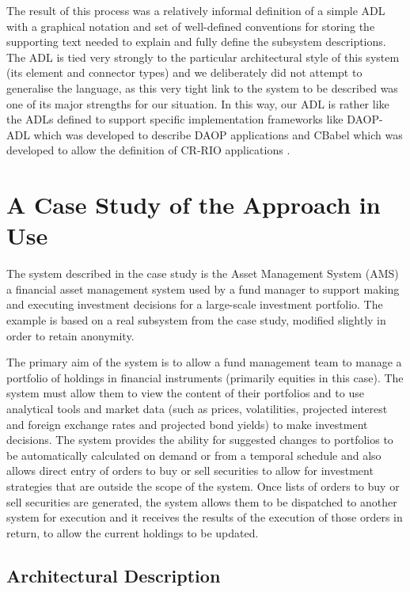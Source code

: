   The result of this process was a relatively informal definition of a simple ADL with a graphical notation and set of well-defined conventions for storing the supporting text needed to explain and fully define the subsystem descriptions.  The ADL is tied very strongly to the particular architectural style of this system (its element and connector types) and we deliberately did not attempt to generalise the language, as this very tight link to the system to be described was one of its major strengths for our situation.  In this way, our ADL is rather like the ADLs defined to support specific implementation frameworks like DAOP-ADL \cite{pinto2003-daopadl} which was developed to describe DAOP applications \cite{pinto2001-daop} and CBabel \cite{rademaker2005-cbabel} which was developed to allow the definition of CR-RIO applications \cite{loques2004-crrio}.

\section{A Case Study of the Approach in Use}

  The system described in the case study is the Asset Management System (AMS) a financial asset management system used by a fund manager to support making and executing investment decisions for a large-scale investment portfolio.  The example is based on a real subsystem from the case study, modified slightly in order to retain anonymity.

  The primary aim of the system is to allow a fund management team to manage a portfolio of holdings in financial instruments (primarily equities in this case).  The system must allow them to view the content of their portfolios and to use analytical tools and market data (such as prices, volatilities, projected interest and foreign exchange rates and projected bond yields) to make investment decisions.  The system provides the ability for suggested changes to portfolios to be automatically calculated on demand or from a temporal schedule and also allows direct entry of orders to buy or sell securities to allow for investment strategies that are outside the scope of the system.  Once lists of orders to buy or sell securities are generated, the system allows them to be dispatched to another system for execution and it receives the results of the execution of those orders in return, to allow the current holdings to be updated.

\subsection{Architectural Description}

